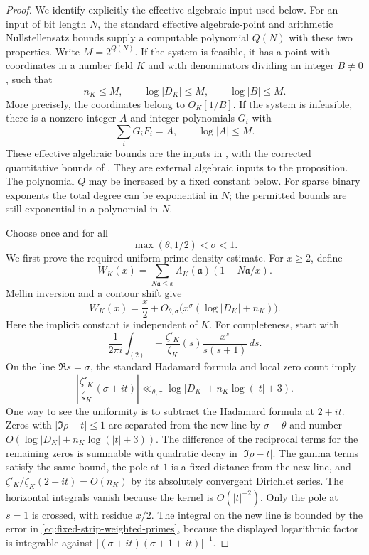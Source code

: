 \documentclass[11pt]{article}
\theoremstyle{definition}
\theoremstyle{remark}
\begin{document}
\begin{proof}
We identify explicitly the effective algebraic input used below.
For an input of bit length $N$, the standard effective
algebraic-point and arithmetic Nullstellensatz bounds supply
a computable polynomial $Q(N)$ with these two properties.
Write $M=2^{Q(N)}$.
If the system is feasible, it has a point with coordinates in
a number field $K$ and with denominators dividing an integer
$B\ne0$, such that
\[
 n_K\le M,\qquad \log|D_K|\le M,\qquad \log|B|\le M.
\]
More precisely, the coordinates belong to
$O_K[1/B]$.  If the system is infeasible, there is a nonzero
integer $A$ and integer polynomials $G_i$ with
\[
 \sum_iG_iF_i=A,\qquad \log|A|\le M.
\]
These effective algebraic bounds are the inputs in
\citet[Theorems~4, 5, and 7, author pp.~8--10]{KoiranExtended1996},
with the corrected quantitative bounds of \citet{KoiranErratum1997}.
They are external algebraic inputs to the proposition.
The polynomial $Q$ may be increased by a fixed constant below.
For sparse binary exponents the total degree can be exponential
in $N$; the permitted bounds are still exponential in a polynomial
in $N$.

Choose once and for all
\[
 \max(\theta,1/2)<\sigma<1.
\]
We first prove the required uniform prime-density estimate.
For $x\ge2$, define
\[
 W_K(x)=\sum_{N\mathfrak a\le x}
       \Lambda_K(\mathfrak a)(1-N\mathfrak a/x).
\]
Mellin inversion and a contour shift give
\begin{equation}\label{eq:fixed-strip-weighted-primes}
 W_K(x)=\frac{x}{2}
       +O_{\theta,\sigma}\bigl(x^\sigma
                         (\log|D_K|+n_K)\bigr).
\end{equation}
Here the implicit constant is independent of $K$.
For completeness, start with
\[
 \frac{1}{2\pi i}\int_{(2)}
 -\frac{\zeta'_K}{\zeta_K}(s)
 \frac{x^s}{s(s+1)}\,ds.
\]
On the line $\Re s=\sigma$, the standard Hadamard formula
and local zero count imply
\[
 \left|\frac{\zeta'_K}{\zeta_K}(\sigma+it)\right|
 \ll_{\theta,\sigma}\log|D_K|+n_K\log(|t|+3).
\]
One way to see the uniformity is to subtract the Hadamard
formula at $2+it$.  Zeros with $|\Im\rho-t|\le1$ are
separated from the new line by $\sigma-\theta$ and number
$O(\log|D_K|+n_K\log(|t|+3))$.  The difference of the
reciprocal terms for the remaining zeros is summable with
quadratic decay in $|\Im\rho-t|$.  The gamma terms satisfy
the same bound, the pole at $1$ is a fixed distance from the
new line, and $\zeta'_K/\zeta_K(2+it)=O(n_K)$ by its
absolutely convergent Dirichlet series.
The horizontal integrals vanish because the kernel is
$O(|t|^{-2})$.  Only the pole at $s=1$ is crossed, with
residue $x/2$.  The integral on the new line is bounded
by the error in \eqref{eq:fixed-strip-weighted-primes},
because the displayed logarithmic factor is integrable
against $|(\sigma+it)(\sigma+1+it)|^{-1}$.


\end{proof}
\end{document}
